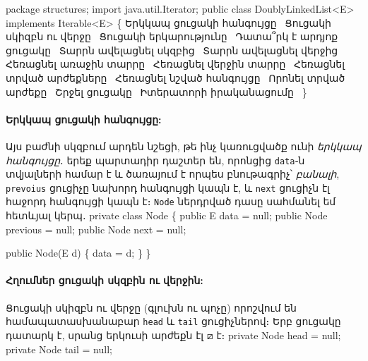 \endmoddef{}
package structures;
import java.util.Iterator;
public class DoublyLinkedList<E> 
    implements Iterable<E> \{
  \LA{}Երկկապ ցուցակի հանգույցը~{\nwtagstyle{}}\RA{}
  \LA{}Ցուցակի սկիզբն ու վերջը~{\nwtagstyle{}}\RA{}
  \LA{}Ցուցակի երկարությունը~{\nwtagstyle{}}\RA{}
  \LA{}Դատա՞րկ է արդյոք ցուցակը~{\nwtagstyle{}}\RA{}
  \LA{}Տարրն ավելացնել սկզբից~{\nwtagstyle{}}\RA{}
  \LA{}Տարրն ավելացնել վերջից~{\nwtagstyle{}}\RA{}
  \LA{}Հեռացնել առաջին տարրը~{\nwtagstyle{}}\RA{}
  \LA{}Հեռացնել վերջին տարրը~{\nwtagstyle{}}\RA{}
  \LA{}Հեռացնել տրված արժեքները~{\nwtagstyle{}}\RA{}
  \LA{}Հեռացնել նշված հանգույցը~{\nwtagstyle{}}\RA{}
  \LA{}Որոնել տրված արժեքը~{\nwtagstyle{}}\RA{}
  \LA{}Շրջել ցուցակը~{\nwtagstyle{}}\RA{}
  \LA{}Իտերատորի իրականացումը~{\nwtagstyle{}}\RA{}
\}
\nwendcode{}\nwdocspar


%
%
\paragraph{Երկկապ ցուցակի հանգույցը:}
Այս բաժնի սկզբում արդեն նշեցի, թե ինչ կառուցվածք ունի
\emph{երկկապ հանգույցը}․ երեք պարտադիր դաշտեր են, որոնցից
\texttt{data}֊ն տվյալների համար է և ծառայում է որպես 
բնութագրիչ՝ \emph{բանալի}, \texttt{prevoius} ցուցիչը
նախորդ հանգույցի կապն է, և \texttt{next} ցուցիչն էլ 
հաջորդ հանգույցի կապն է։ \texttt{Node} ներդրված դասը
սահմանել եմ հետևյալ կերպ․
\nwenddocs{}\endmoddef{}
private class Node \{
  public E data = null;
  public Node previous = null;
  public Node next = null;

  public Node(E d)
  \{ data = d; \}
\} 
\nwendcode{}\nwdocspar

%
\paragraph{Հղումներ ցուցակի սկզբին ու վերջին:}
Ցուցակի սկիզբն ու վերջը (գլուխն ու պոչը) որոշվում են
համապատասխանաբար \texttt{head} և \texttt{tail} ցուցիչներով։ 
Երբ ցուցակը դատարկ է, սրանց երկուսի արժեքն էլ \(\boxslash\) է։
\nwenddocs{}\endmoddef{}
private Node head = null;
private Node tail = null;
\nwendcode{}\nwdocspar

